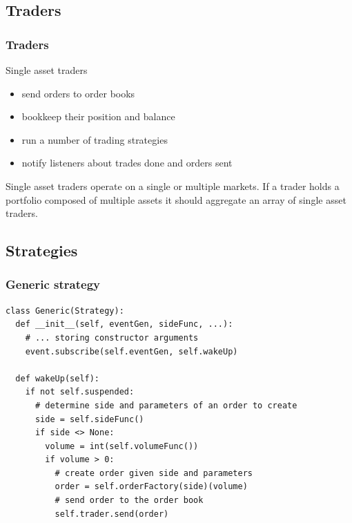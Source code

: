 \documentclass{beamer}
\begin{document}
\subsection{Traders}
\begin{frame}
\frametitle{Traders}
Single asset traders
\begin{itemize}
  \item send orders to order books
  \item bookkeep their position and balance
  \item run a number of trading strategies
  \item notify listeners about trades done and orders sent
\end{itemize}
Single asset traders operate on a single or multiple markets.
If a trader holds a portfolio composed of multiple assets it should aggregate an array of single asset traders.
\end{frame}

\subsection{Strategies}
\begin{frame}[fragile]
\frametitle{Generic strategy}
\begin{verbatim}
class Generic(Strategy):
  def __init__(self, eventGen, sideFunc, ...):
    # ... storing constructor arguments
    event.subscribe(self.eventGen, self.wakeUp)

  def wakeUp(self):
    if not self.suspended:
      # determine side and parameters of an order to create
      side = self.sideFunc()
      if side <> None:
        volume = int(self.volumeFunc())
        if volume > 0:
          # create order given side and parameters
          order = self.orderFactory(side)(volume)
          # send order to the order book
          self.trader.send(order)
\end{verbatim}
\end{frame}

\end{document}
